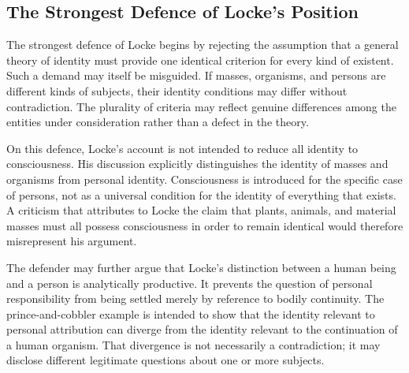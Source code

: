 
\subsection{The Strongest Defence of Locke's Position}
\label{subsec:ch08-locke-defence}

\label{para:VS.B01.P01.C08.S08.SS11.P001}

The strongest defence of Locke begins by rejecting
the assumption that a general theory of identity
must provide one identical criterion for every
kind of existent. Such a demand may itself be
misguided. If masses, organisms, and persons
are different kinds of subjects, their identity
conditions may differ without contradiction.
The plurality of criteria may reflect genuine
differences among the entities under consideration
rather than a defect in the theory.

\label{para:VS.B01.P01.C08.S08.SS11.P002}

On this defence, Locke's account is not intended
to reduce all identity to consciousness. His
discussion explicitly distinguishes the identity
of masses and organisms from personal identity.
Consciousness is introduced for the specific
case of persons, not as a universal condition
for the identity of everything that exists.
A criticism that attributes to Locke the claim
that plants, animals, and material masses must
all possess consciousness in order to remain
identical would therefore misrepresent his
argument.

\label{para:VS.B01.P01.C08.S08.SS11.P003}

The defender may further argue that Locke's
distinction between a human being and a person
is analytically productive. It prevents the
question of personal responsibility from being
settled merely by reference to bodily continuity.
The prince-and-cobbler example is intended to
show that the identity relevant to personal
attribution can diverge from the identity
relevant to the continuation of a human organism.
That divergence is not necessarily a contradiction;
it may disclose different legitimate questions
about one or more subjects.

